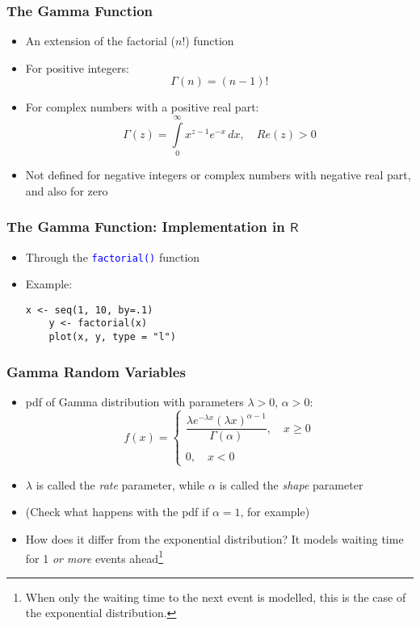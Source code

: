 \documentclass[10pt]{beamer}
\newcommand{\cc}[1]{\texttt{\textcolor{blue}{#1}}}
\theoremstyle{definition}
\begin{document}
\begin{frame}[fragile]
\frametitle{The Gamma Function}
\begin{itemize}
	\item An extension of the factorial ($n!$) function

	\item For positive integers:
	\[
		\Gamma(n) = (n-1)!
	\]

	\item For complex numbers with a positive real part:
	\[
		\Gamma(z) = \int\limits_{0}^{\infty}x^{z-1}e^{-x}\,dx, \quad Re(z) > 0
	\]

	\item Not defined for negative integers or complex numbers with negative real part, and also for zero
\end{itemize}
\end{frame} 

\begin{frame}[fragile]
\frametitle{The Gamma Function: Implementation in $\mathsf{R}$}
\begin{itemize}
	\item Through the \cc{factorial()} function
	\item Example:
	\begin{lstlisting}[style = rstyle, breaklines]
	x <- seq(1, 10, by=.1)
	y <- factorial(x)
	plot(x, y, type = "l")
	\end{lstlisting}
\end{itemize}
\end{frame} 

\begin{frame}[fragile]
\frametitle{Gamma Random Variables}
\begin{itemize}
	\item pdf of Gamma distribution with parameters  $ \lambda > 0,\, \alpha > 0 $:
	\[
		f(x) = 
		\left\{
		\begin{array}{lcl}
			\dfrac{\lambda e^{-\lambda x}(\lambda x)^{\alpha-1}}{\Gamma(\alpha)}, \quad x \geq 0 \\
			\quad\\
			0, \quad x < 0
		\end{array}
		\right.
	\]
	
	\item $ \lambda $ is called the \textit{rate} parameter, while $ \alpha $ is called the \textit{shape} parameter
	
	\item (Check what happens with the pdf if $ \alpha = 1 $, for example)
	
	\item How does it differ from the exponential distribution? It models waiting time for 1 \textit{or more} events ahead\footnote{When only the waiting time to the next event is modelled, this is the case of the exponential distribution.}
\end{itemize}
\end{frame}
\end{document}
